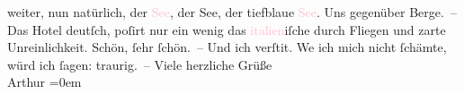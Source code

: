                weiter, nun natürlich, der \textcolor{pink}{See}{}, der See, der tiefblaue \textcolor{pink}{See}{}. Uns gegenüber Berge. – Das Hotel deutſch, poſirt nur ein
               wenig das \textcolor{pink}{italien}{}\ledrightnote{\textcolor{pink}{Italien}}iſche durch Fliegen und zarte
               Unreinlichkeit. Schön, ſehr ſchön. – Und ich verſti{\geminationm}t.
                  We{\geminationn} ich mich nicht ſchämte, würd ich ſagen:
               traurig. –\pend
           \pstart
           Viele herzliche Grüße{\\[\baselineskip]}\spacefill\mbox{Arthur}\pend
           \leftskip=0em{}\endnumbering{}  
      